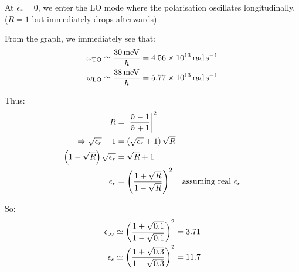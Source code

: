 \begin{parts}
	At $\epsilon_r = 0$, we enter the LO mode where the polarisation oscillates longitudinally. ($R = 1$ but immediately drops afterwards)
	
	From the graph, we immediately see that:
	\begin{align*}
		\omega_\textnormal{TO} &\simeq \frac{\SI{30}{\milli\electronvolt}}{\hbar} = \SI{4.56e13}{\radian\per\second} \\
		\omega_\textnormal{LO} &\simeq \frac{\SI{38}{\milli\electronvolt}}{\hbar} = \SI{5.77e13}{\radian\per\second}
	\end{align*}
	
	Thus:
	\begin{align*}
		R &= \left|\frac{\tilde{n} - 1}{\tilde{n} + 1}\right|^2 \\
		\Rightarrow \sqrt{\epsilon_r} - 1 &= \left(\sqrt{\epsilon_r} + 1\right) \sqrt{R} \\
		\left(1 - \sqrt{R}\right) \sqrt{\epsilon_r} &= \sqrt{R} + 1 \\
		\epsilon_r &= \left(\frac{1 + \sqrt{R}}{1 - \sqrt{R}}\right)^2 \textnormal{\hspace{1em}assuming real $\epsilon_r$}
	\end{align*}
	
	So:
	\begin{align*}
		\epsilon_\infty &\simeq \left(\frac{1 + \sqrt{\num{.1}}}{1 - \sqrt{\num{.1}}}\right)^2 = \num{3.71} \\
		\epsilon_s &\simeq \left(\frac{1 + \sqrt{\num{.3}}}{1 - \sqrt{\num{.3}}}\right)^2 = \num{11.7}
	\end{align*}
	

\end{parts}
